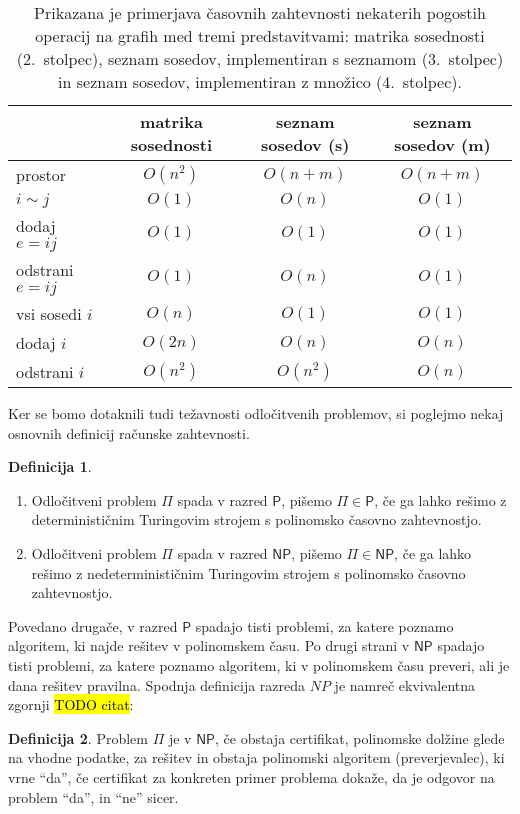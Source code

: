 \documentclass[12pt,a4paper,twoside]{article}
\theoremstyle{definition} %
\newtheorem{definicija}{Definicija}[section]
\theoremstyle{plain} %
\numberwithin{equation}{section}  %
\renewcommand{\P}{\ensuremath{\mathsf{P}}}
\newcommand{\NP}{\ensuremath{\mathsf{NP}}}
\begin{document}
\begin{table}[h]
    \centering
    \begin{tabular}{lccc}
        \toprule
        & matrika sosednosti & seznam sosedov (s) & seznam sosedov (m) \\ \midrule
        prostor & $O(n^2)$ & $O(n + m)$ & $O(n + m)$ \\
        $i \sim j$ & $O(1)$ & $O(n)$ & $O(1)$ \\
        dodaj $e = ij$ & $O(1)$ & $O(1)$ & $O(1)$ \\
        odstrani $e = ij$ & $O(1)$ & $O(n)$ & $O(1)$ \\
        vsi sosedi $i$ & $O(n)$ & $O(1)$ & $O(1)$\\
        dodaj $i$ & $O(2n)$ & $O(n)$ & $O(n)$ \\
        odstrani $i$ & $O(n^2)$ & $O(n^2)$ & $O(n)$ \\
        \bottomrule
    \end{tabular}
    \caption{Prikazana je primerjava časovnih zahtevnosti nekaterih pogostih operacij na grafih med tremi predstavitvami: matrika sosednosti (2.~stolpec), seznam sosedov, implementiran s seznamom (3.~stolpec) in seznam sosedov, implementiran z množico (4.~stolpec).}
    \label{tab:primerjava-predstavitev}
\end{table}

Ker se bomo dotaknili tudi težavnosti odločitvenih problemov, si poglejmo nekaj osnovnih definicij računske zahtevnosti.
\begin{definicija}
    \begin{enumerate}
        \item Odločitveni problem $\Pi$ spada v razred \P, pišemo $\Pi \in \P$, če ga lahko rešimo z determinističnim Turingovim strojem s polinomsko časovno zahtevnostjo.
        \item Odločitveni problem $\Pi$ spada v razred \NP, pišemo $\Pi \in \NP$, če ga lahko rešimo z nedeterminističnim Turingovim strojem s polinomsko časovno zahtevnostjo.
    \end{enumerate}
\end{definicija}
Povedano drugače, v razred $\P$ spadajo tisti problemi, za katere poznamo algoritem, ki najde rešitev v polinomskem času. Po drugi strani v $\NP$ spadajo tisti problemi, za katere poznamo algoritem, ki v polinomskem času preveri, ali je dana rešitev pravilna. Spodnja definicija razreda $NP$ je namreč ekvivalentna zgornji \hl{TODO citat}:
\begin{definicija}
    Problem $\Pi$ je v $\NP$, če obstaja certifikat, polinomske dolžine glede na vhodne podatke, za rešitev in obstaja polinomski algoritem (preverjevalec), ki vrne ``da'', če certifikat za konkreten primer problema dokaže, da je odgovor na problem ``da'', in ``ne'' sicer.
\end{definicija}
\end{document}
